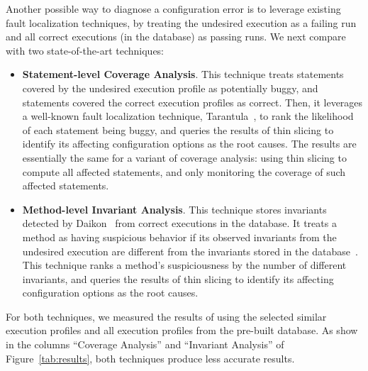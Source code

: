 

Another possible way to diagnose a configuration error is to leverage
existing fault localization techniques, by treating the undesired
execution as a failing run and all correct executions (in the database)
as passing runs. We next compare \ourtool with two state-of-the-art
techniques: %

\begin{itemize}
\item \textbf{Statement-level Coverage Analysis}. This technique treats statements covered
by the undesired execution profile as potentially buggy, and statements
covered the correct execution profiles as correct.
Then, it leverages a well-known fault localization technique,
Tarantula~\cite{Jones:2002}, to rank the likelihood of each
statement being buggy, and queries the results of thin slicing
to identify its affecting configuration options as the root causes.
The results are essentially the same for a variant of
coverage analysis: using thin slicing to compute all affected statements,
and only monitoring the coverage of such affected statements.

\item \textbf{Method-level Invariant Analysis}. This technique stores invariants detected
by Daikon~\cite{Ernst:1999} from correct executions in the database.
It treats a method as having suspicious behavior if its observed invariants
from the undesired execution are different from the invariants stored
in the database~\cite{McCamant:2003}. This technique ranks a method's suspiciousness by
the number of different invariants, and queries the results of thin slicing
to identify its affecting configuration options as the root causes. 
\end{itemize}


For both techniques, we measured the results of using the selected
similar execution profiles and all execution profiles from the pre-built
database. As show in the columns ``Coverage Analysis'' and ``Invariant Analysis''
of Figure~\ref{tab:results}, both techniques produce less accurate results.

